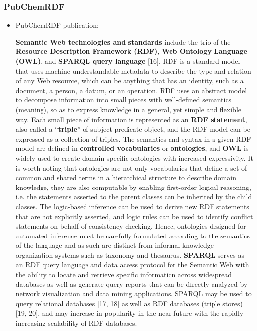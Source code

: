 \documentclass{article}
\begin{document}
\subsubsection{PubChemRDF}

\begin{itemize}

\item PubChemRDF publication:
\begin{displayquote}
\textbf{Semantic Web technologies and standards} include the trio of the \textbf{Resource Description Framework (RDF)}, \textbf{Web Ontology Language (OWL)}, and \textbf{SPARQL query language} [16]. RDF is a standard model that uses machine-understandable metadata to describe the type and relation of any Web resource, which can be anything that has an identity, such as a document, a person, a datum, or an operation. RDF uses an abstract model to decompose information into small pieces with well-defined semantics (meaning), so as to express knowledge in a general, yet simple and flexible way. Each small piece of information is represented as an \textbf{RDF statement}, also called a “\textbf{triple}” of subject-predicate-object, and the RDF model can be expressed as a collection of triples. The semantics and syntax in a given RDF model are defined in \textbf{controlled vocabularies} or \textbf{ontologies}, and \textbf{OWL} is widely used to create domain-specific ontologies with increased expressivity. It is worth noting that ontologies are not only vocabularies that define a set of common and shared terms in a hierarchical structure to describe domain knowledge, they are also computable by enabling first-order logical reasoning, i.e. the statements asserted to the parent classes can be inherited by the child classes. The logic-based inference can be used to derive new RDF statements that are not explicitly asserted, and logic rules can be used to identify conflict statements on behalf of consistency checking. Hence, ontologies designed for automated inference must be carefully formulated according to the semantics of the language and as such are distinct from informal knowledge organization systems such as taxonomy and thesaurus. \textbf{SPARQL} serves as an RDF query language and data access protocol for the Semantic Web with the ability to locate and retrieve specific information across widespread databases as well as generate query reports that can be directly analyzed by network visualization and data mining applications. SPARQL may be used to query relational databases [17, 18] as well as RDF databases (triple stores) [19, 20], and may increase in popularity in the near future with the rapidly increasing scalability of RDF databases.
\end{displayquote}

\end{itemize}
\end{document}
